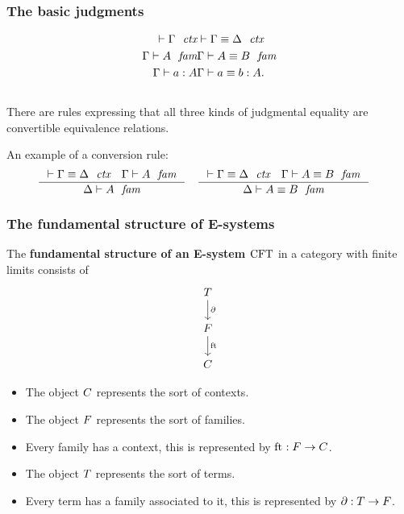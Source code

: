 \documentclass[handout]{beamer}
\newcommand\important[1]{\textbf{\color{red!90!black}#1}}
\begin{document}
\begin{frame}
\frametitle{\bf The basic judgments}
\begin{align*}
\jalign\jctx{\Gamma} 
& \jalign\jctxeq{\Gamma}{\Delta}
  \\
\jalign\jfam{\Gamma}{A} 
& \jalign\jfameq{\Gamma}{A}{B}
  \\
\jalign\jterm{\Gamma}{A}{a} 
& \jalign\jtermeq{\Gamma}{A}{a}{b}.
\end{align*}
\\[\baselineskip]
There are rules expressing that all three kinds of judgmental equality are
convertible equivalence relations.

\pause
An example of a conversion rule:
\begin{align*}
& \inference
  { \jctxeq{\Gamma}{\Delta}
    \jfam{\Gamma}{A}
    }
  { \jfam{\Delta}{A}
    }
& & \inference
    { \jctxeq{\Gamma}{\Delta}
      \jfameq{\Gamma}{A}{B}
      }
    { \jfameq{\Delta}{A}{B}
      }
\end{align*}
\end{frame}

\begin{frame}
\frametitle{\bf The fundamental structure of E-systems}
The \important{fundamental structure of an E-system $\mathrm{CFT}$} in a category with finite limits consists of
\begin{equation*}
\begin{tikzcd}
\stesyst
  \ar{d}{\ebd}
  \\
\stesysf
  \ar{d}{\eft}
  \\
\stesysc
\end{tikzcd}
\end{equation*}
\pause
\begin{itemize}
\item The object $C$ represents the sort of contexts.
\pause
\item The object $F$ represents the sort of families.
\pause
\item Every family has a context, this is represented by $\mathrm{ft}_{}:F\to C$.
\pause
\item The object $T$ represents the sort of terms.
\pause
\item Every term has a family associated to it, this is represented by
$\partial_{}:T\to F$.
\end{itemize}
\end{frame}
\end{document}
